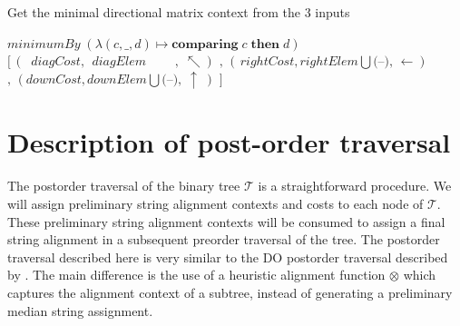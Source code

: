 \documentclass[11pt]{article}
\newcommand*\gap{\textrm{(--)}}
\begin{document}
\begin{algorithm}
  \caption{Get the minimal directional matrix context from the $3$ inputs}\label{getMinimal}
  \begin{algorithmic}[1]
      \State \Return $minimumBy \; \left(\lambda \left(c, \_, d \right) \mapsto \textbf{comparing}\; c \; \textbf{then} \; d\right)$\newline\hspace*{3.85cm}
      $[\, \left(\;\;diagCost, \;\,diagElem   \quad\;\;\;\;\,   ,\;      \nwarrow    \right)$\newline\hspace*{3.85cm}
      $,\, \left(\, rightCost,    rightElem \bigcup \gap, \, \leftarrow    \right)$\newline\hspace*{3.85cm}
      $,\, \left(    downCost,     downElem \bigcup \gap, \;   \uparrow \; \right)$\newline\hspace*{3.85cm}
      $]$
    \EndFunction
  \end{algorithmic}
\end{algorithm}


\section{Description of post-order traversal}
The postorder traversal of the binary tree $\mathcal{T}$ is a straightforward procedure.
We will assign preliminary string alignment contexts and costs to each node of $\mathcal{T}$.
These preliminary string alignment contexts will be consumed to assign a final string alignment in a subsequent preorder traversal of the tree.
The postorder traversal described here is very similar to the  DO postorder traversal described by \cite{Wheeler2003}.
The main difference is the use of a heuristic alignment function $\otimes$ which captures the alignment context of a subtree, instead of generating a preliminary median string assignment.
\end{document}
